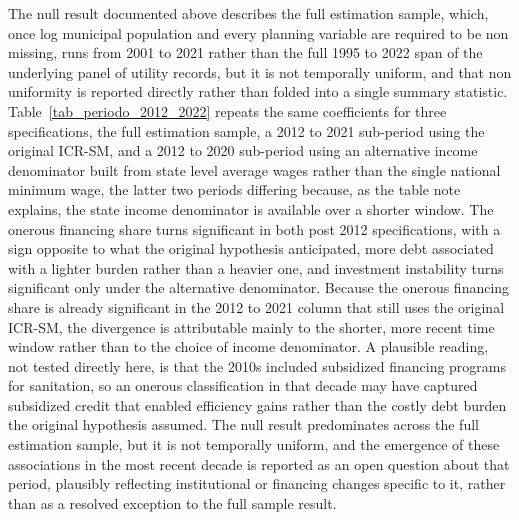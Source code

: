\documentclass[pdflatex,sn-mathphys-num]{sn-jnl}%
\theoremstyle{thmstyleone}%
\theoremstyle{thmstyletwo}%
\theoremstyle{thmstylethree}%
\begin{document}
The null result documented above describes the full estimation sample, which, once log municipal population and every planning variable are required to be non missing, runs from 2001 to 2021 rather than the full 1995 to 2022 span of the underlying panel of utility records, but it is not temporally uniform, and that non uniformity is reported directly rather than folded into a single summary statistic. Table~\ref{tab_periodo_2012_2022} repeats the same coefficients for three specifications, the full estimation sample, a 2012 to 2021 sub-period using the original ICR-SM, and a 2012 to 2020 sub-period using an alternative income denominator built from state level average wages rather than the single national minimum wage, the latter two periods differing because, as the table note explains, the state income denominator is available over a shorter window. The onerous financing share turns significant in both post 2012 specifications, with a sign opposite to what the original hypothesis anticipated, more debt associated with a lighter burden rather than a heavier one, and investment instability turns significant only under the alternative denominator. Because the onerous financing share is already significant in the 2012 to 2021 column that still uses the original ICR-SM, the divergence is attributable mainly to the shorter, more recent time window rather than to the choice of income denominator. A plausible reading, not tested directly here, is that the 2010s included subsidized financing programs for sanitation, so an onerous classification in that decade may have captured subsidized credit that enabled efficiency gains rather than the costly debt burden the original hypothesis assumed. The null result predominates across the full estimation sample, but it is not temporally uniform, and the emergence of these associations in the most recent decade is reported as an open question about that period, plausibly reflecting institutional or financing changes specific to it, rather than as a resolved exception to the full sample result.
\end{document}
